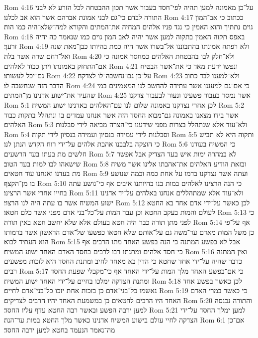 Rom 4:16  על־כן מאמונה למען תהיה לפי־חסד בעבור אשר תכון ההבטחה לכל הזרע לא לבני התורה לבדם כי־גם לבני אמונת אברהם אשר הוא אב לכלנו׃
Rom 4:17  ככתוב כי אב־המון גוים נתתיך והוא האמין כי נגד פניו אלהים המחיה את־המתים והקורא למה־שלא־היה כמו הוה׃
Rom 4:18  באפס תקוה האמין בתקוה למען אשר יהיה לאב המון גוים כמו שנאמר כה יהיה זרעך׃
Rom 4:19  ולא רפתה אמונתו בהתבוננו אל־בשרו אשר היה כמת בהיותו כבן־מאת שנה ואל־רחם שרה אשר בלה׃
Rom 4:20  ולא־חלק לבו בהבטחת האלהים כמחסר אמונה כי אם־התחזק באמונתו ויתן כבוד לאלהים׃
Rom 4:21  ונפשו ידעת מאד כי את־אשר הבטיח גם־יכל לעשותו׃
Rom 4:22  על־כן גם־נחשבה־לו לצדקה׃
Rom 4:23  ולא־למענו לבד כתוב הדבר הזה שנחשבה לו׃
Rom 4:24  כי אם־גם למעננו אשר עתידה להחשב לנו המאמינים במי שהעיר את־ישוע אדנינו מן־המתים׃
Rom 4:25  אשר נמסר בעבור פשעינו ונעור לבעבור צדקנו׃
Rom 5:1  לכן אחרי נצדקנו באמונה שלום לנו עם־האלהים באדנינו ישוע המשיח׃
Rom 5:2  אשר בידו מצאנו באמונה גם־מבוא החסד הזה אשר אנחנו עמדים בו ונתהלל בתקות כבוד האלהים׃
Rom 5:3  ולא־עוד אלא שנתהלל בצרות מפני שידענו כי־הצרה מביאה לידי סבלנות׃
Rom 5:4  וסבלנות לידי עמידה בנסיון ועמידה בנסיון לידי תקוה׃
Rom 5:5  ותקוה היא לא תביש כי הוצקה בלבבנו אהבת אלהים על־ידי רוח הקדש הנתן לנו׃
Rom 5:6  כי המשיח בעודנו חלשים מת בעתו בעד הרשעים׃
Rom 5:7  לא במהרה ימות איש בעד הצדיק אבל אפשר שישאהו לבו למות בעד הטוב׃
Rom 5:8  ובזאת הודיע האלהים את־אהבתו אלינו אשר משיח מת בעדנו ואנחנו עוד חטאים׃
Rom 5:9  ועתה אשר נצדקנו בדמו על אחת כמה וכמה שנושע בו מן־הקצף׃
Rom 5:10  כי הנה הרצינו לאלהים במות בנו בהיותנו איבים אף כי־נושע עתה בחייו אחרי אשר הרצינו׃
Rom 5:11  ולא־עוד אלא שמתהללים אנחנו באלהים על־יד אדנינו ישוע המשיח אשר בו עתה היה לנו הרצוי׃
Rom 5:12  לכן כאשר על־ידי אדם אחד בא החטא לעולם והמות בעקב החטא וכן עבר המות על־כל־בני אדם מפני אשר כלם חטאו׃
Rom 5:13  כי לפני מתן תורה כבר היה חטא בעולם אלא שלא יחשב חטא באין תורה׃
Rom 5:14  אף על־פי כן משל המות מאדם עד־משה גם על־אותם שלא חטאו כפשעו של־אדם הראשון אשר בדמותו הוא העתיד לבוא׃
Rom 5:15  אבל לא כפשע המתנה כי הנה בפשע האחד מתו הרבים אף כי־חסד אלהים ומתנתו רבו לרבים בחסד האדם האחד ישוע המשיח׃
Rom 5:16  ואין המתנה כדבר שהיה על־ידי אחד שחטא כי הדין בא מאחד לחיב ומתנת החסד היא לזכות מפשעים רבים׃
Rom 5:17  כי אם־בפשע האחד מלך המות על־ידי האחד אף כי־מקבלי שפעת החסד ומתנת הצדקה ימלכו בחיים על־ידי האחד ישוע המשיח׃
Rom 5:18  לכן כאשר בפשע אחד נאשמו כל־בני־אדם כן בזכות אחת יזכו כל־בני־אדם לחיים׃
Rom 5:19  כי כאשר במרי האדם האחד היו הרבים לחטאים כן במשמעת האחד יהיו הרבים לצדיקים׃
Rom 5:20  והתורה נכנסה למען ירבה הפשע ובאשר רבה החטא עדף עליו החסד׃
Rom 5:21  למען ימלך החסד על־ידי הצדקה לחיי עולם בישוע המשיח אדנינו כאשר מלך החטא במות עד־הנה׃
Rom 6:1  אם־כן מה־נאמר הנעמד בחטא למען ירבה החסד׃
